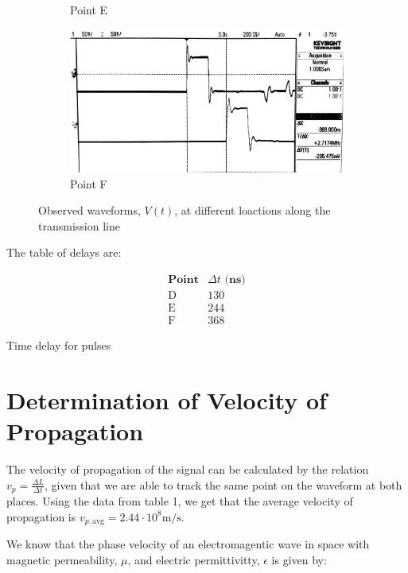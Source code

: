 \documentclass[10pt]{article}
\begin{document}
\begin{figure} [h]
\begin{subfigure}[b]{0.35\textwidth}
        \caption{Point E}
    \end{subfigure}
    \begin{subfigure}[b]{0.35\textwidth}
        \includegraphics[width=\textwidth]{../photos/lab1/v_t_pt_f.jpg}
        \caption{Point F}
    \end{subfigure}
    \caption{Observed waveforms, $V(t)$, at different loactions along the transmission line}
    \label{}
\end{figure}

The table of delays are:

\begin{table} [h]
    \[
        \begin{array}{c|c}
            \textbf{Point} & \Delta t \textbf{ (ns)} \\ \hline
            \text{D} & 130\\
            \text{E} & 244\\
            \text{F} & 368
        \end{array}
    \]
    \caption{Time delay for pulses}
\end{table}

\section{Determination of Velocity of Propagation}

The velocity of propagation of the signal can be calculated by the relation $v_p = \frac{\Delta L}{\Delta t}$, given that
we are able to track the same point on the waveform at both places. Using the data from table 1,
we get that the average velocity of propagation is $v_{p, \text{avg}} = 2.44 \cdot 10^8 \text{m/s}$.

We know that the phase velocity of an electromagentic wave in space with magnetic permeability, $\mu$,
and electric permittivitty, $\epsilon$  is given by: 
\end{document}
